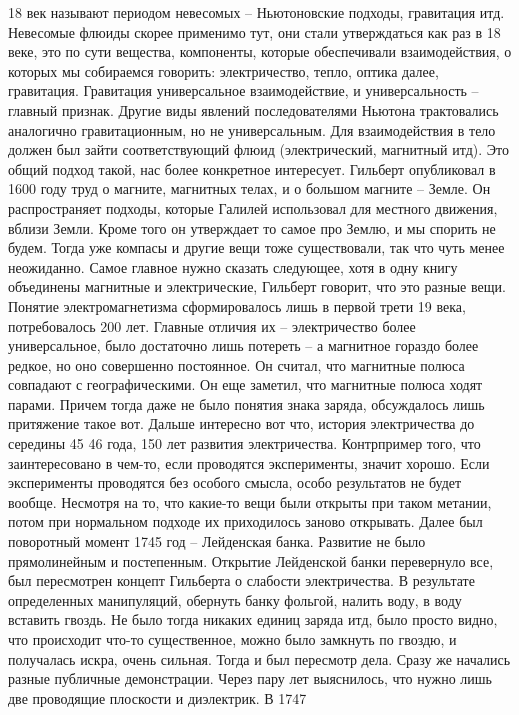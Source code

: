 \documentclass[a4paper, 12pt]{article}
\begin{document}
18 век называют периодом невесомых -- Ньютоновские подходы, гравитация 
итд. Невесомые флюиды скорее применимо тут, они стали утверждаться как 
раз в 18 веке, это по сути вещества, компоненты, которые обеспечивали 
взаимодействия, о которых мы собираемся говорить: электричество, тепло, 
оптика далее, гравитация. Гравитация универсальное взаимодействие, 
и универсальность -- главный признак. Другие виды явлений 
последователями Ньютона трактовались аналогично гравитационным, но не 
универсальным. Для взаимодействия в тело должен был зайти 
соответствующий флюид (электрический, магнитный итд). Это общий подход 
такой, нас более конкретное интересует. Гильберт опубликовал в 1600 году 
труд о магните, магнитных телах, и о большом магните -- Земле. Он 
распространяет подходы, которые Галилей использовал для местного 
движения, вблизи Земли. Кроме того он утверждает то самое про Землю, 
и мы спорить не будем. Тогда уже компасы и другие вещи тоже 
существовали, так что чуть менее неожиданно. Самое главное нужно сказать 
следующее, хотя в одну книгу объединены магнитные и электрические, 
Гильберт говорит, что это разные вещи. Понятие электромагнетизма 
сформировалось лишь в первой трети 19 века, потребовалось 200 лет. 
Главные отличия их -- электричество более универсальное, было достаточно 
лишь потереть -- а магнитное гораздо более редкое, но оно совершенно 
постоянное. Он считал, что магнитные полюса совпадают с географическими. 
Он еще заметил, что магнитные полюса ходят парами. Причем тогда даже не 
было понятия знака заряда, обсуждалось лишь притяжение такое вот. Дальше 
интересно вот что, история электричества до середины 45 46 года, 150 лет 
развития электричества. Контрпример того, что заинтересовано в чем-то, 
если проводятся эксперименты, значит хорошо. Если эксперименты 
проводятся без особого смысла, особо результатов не будет вообще. 
Несмотря на то, что какие-то вещи были открыты при таком метании, потом 
при нормальном подходе их приходилось заново открывать. Далее был 
поворотный момент 1745 год -- Лейденская банка. Развитие не было 
прямолинейным и постепенным. Открытие Лейденской банки перевернуло все, 
был пересмотрен концепт Гильберта о слабости электричества. В результате 
определенных манипуляций, обернуть банку фольгой, налить воду, в воду 
вставить гвоздь. Не было тогда никаких единиц заряда итд, было просто 
видно, что происходит что-то существенное, можно было замкнуть по 
гвоздю, и получалась искра, очень сильная. Тогда и был пересмотр дела. 
Сразу же начались разные публичные демонстрации. Через пару лет 
выяснилось, что нужно лишь две проводящие плоскости и диэлектрик. В 1747 
\end{document}

